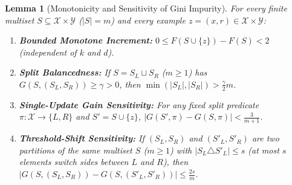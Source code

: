 \documentclass[11pt]{article}
\newtheorem{lemma}{Lemma}
\theoremstyle{definition}
\newcommand{\calX}{\mathcal{X}}
\newcommand{\calY}{\mathcal{Y}}
\begin{document}
\begin{lemma}[Monotonicity and Sensitivity of Gini Impurity]
\label{lem:gini}
For every finite multiset $S \subseteq \calX \times \calY$ ($|S| = m$) and every example $z = (x, r) \in \calX \times \calY$:
\begin{enumerate}[leftmargin=1.5em,itemsep=2pt]
    \item \textbf{Bounded Monotone Increment:} $0 \le F(S \cup \{z\}) - F(S) < 2$ (independent of $k$ and $d$).
    \item \textbf{Split Balancedness:} If $S = S_L \sqcup S_R$ ($m \ge 1$) has $G(S, (S_L, S_R)) \ge \gamma > 0$, then $\min(|S_L|, |S_R|) > \frac{\gamma}{2} m$.
    \item \textbf{Single-Update Gain Sensitivity:} For any fixed split predicate $\pi : \calX \to \{L, R\}$ and $S' = S \cup \{z\}$, $|G(S', \pi) - G(S, \pi)| < \frac{3}{m + 1}$.
    \item \textbf{Threshold-Shift Sensitivity:} If $(S_L, S_R)$ and $(S'_L, S'_R)$ are two partitions of the same multiset $S$ ($m \ge 1$) with $|S_L \triangle S'_L| \le s$ (at most $s$ elements switch sides between $L$ and $R$), then $|G(S, (S_L, S_R)) - G(S, (S'_L, S'_R))| \le \frac{2s}{m}$.
\end{enumerate}
\end{lemma}
\end{document}
